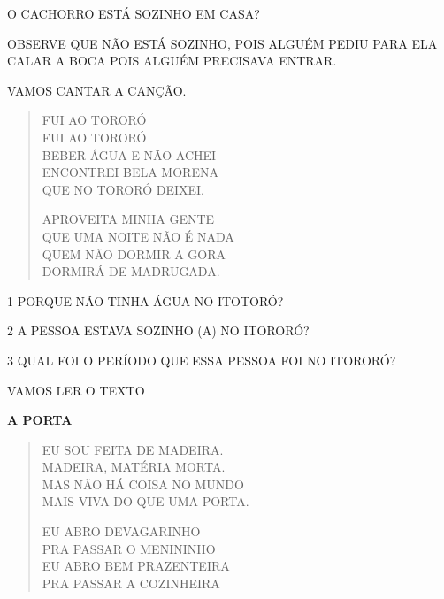 \begin{escola}
{O CACHORRO ESTÁ SOZINHO EM CASA?

OBSERVE QUE NÃO ESTÁ SOZINHO, POIS ALGUÉM PEDIU PARA ELA CALAR A BOCA
POIS ALGUÉM PRECISAVA ENTRAR.
}



VAMOS CANTAR A CANÇÃO.

\begin{verse}
FUI AO TORORÓ\\
FUI AO TORORÓ\\
BEBER ÁGUA E NÃO ACHEI\\
ENCONTREI BELA MORENA\\
QUE NO TORORÓ DEIXEI.

APROVEITA MINHA GENTE\\
QUE UMA NOITE NÃO É NADA\\
QUEM NÃO DORMIR A GORA\\
DORMIRÁ DE MADRUGADA.
\end{verse}


\num{1} PORQUE NÃO TINHA ÁGUA NO ITOTORÓ?


\num{2} A PESSOA ESTAVA SOZINHO (A) NO ITORORÓ?


\num{3} QUAL FOI O PERÍODO QUE ESSA PESSOA FOI NO ITORORÓ?


VAMOS LER O TEXTO

\textbf{A PORTA}

\begin{verse}
EU SOU FEITA DE MADEIRA.\\
MADEIRA, MATÉRIA MORTA.\\
MAS NÃO HÁ COISA NO MUNDO\\
MAIS VIVA DO QUE UMA PORTA.

EU ABRO DEVAGARINHO\\
PRA PASSAR O MENININHO\\
EU ABRO BEM PRAZENTEIRA\\
PRA PASSAR A COZINHEIRA
\end{verse}


\end{escola}
